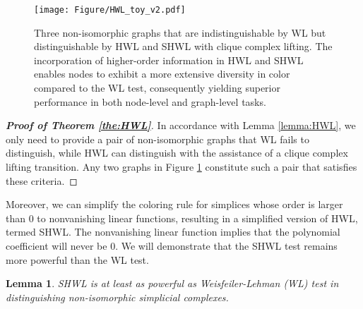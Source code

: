\documentclass[letterpaper]{article} \usepackage{aaai24}
\theoremstyle{plain}
\newtheorem{lemma}[theorem]{Lemma}
\theoremstyle{definition}
\theoremstyle{remark}
\begin{document}
\begin{figure}[!t]
\centering
\texttt{[image: Figure/HWL\_toy\_v2.pdf]}
\caption{Three non-isomorphic graphs that are indistinguishable by WL but distinguishable by HWL and SHWL with clique complex lifting. The incorporation of higher-order information in HWL and SHWL enables nodes to exhibit a more extensive diversity in color compared to the WL test, consequently yielding superior performance in both node-level and graph-level tasks.} 
\label{fig:HWL_toy}
\end{figure}





\begin{proof}[\textbf{Proof of Theorem \ref{the:HWL}}]
In accordance with Lemma \ref{lemma:HWL}, we only need to provide a pair of non-isomorphic graphs that WL fails to distinguish, while HWL can distinguish with the assistance of a clique complex lifting transition. Any two graphs in Figure \ref{fig:HWL_toy} constitute such a pair that satisfies these criteria.
\end{proof}




Moreover, we can simplify the coloring rule for simplices whose order is larger than 0 to nonvanishing linear functions, resulting in a simplified version of HWL, termed SHWL. 
The nonvanishing linear function implies that the polynomial coefficient will never be 0. 
We will demonstrate that the SHWL test remains more powerful than the WL test.

\begin{lemma}
\label{lemma:SHWL}
SHWL is at least as powerful as Weisfeiler-Lehman (WL) test in distinguishing non-isomorphic simplicial complexes.
\end{lemma}
\end{document}
